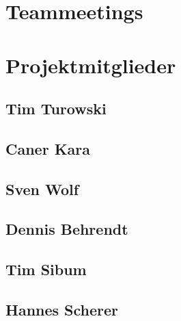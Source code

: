 



\section{Teammeetings}

\newpage
\section{Projektmitglieder}
\subsection{Tim Turowski}

\newpage
\subsection{Caner Kara}

\newpage
\subsection{Sven Wolf}

\newpage
\subsection{Dennis Behrendt}

\newpage
\subsection{Tim Sibum}

\newpage
\subsection{Hannes Scherer}


